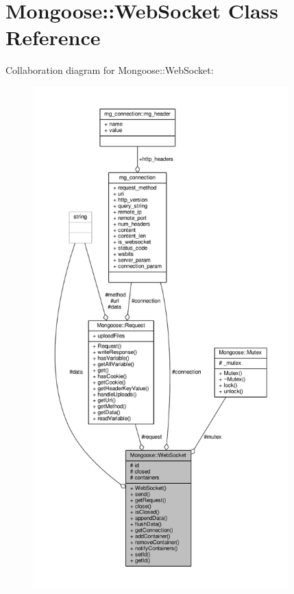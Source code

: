 \hypertarget{classMongoose_1_1WebSocket}{}\section{Mongoose\+:\+:Web\+Socket Class Reference}
\label{classMongoose_1_1WebSocket}


Collaboration diagram for Mongoose\+:\+:Web\+Socket\+:
\nopagebreak
\begin{figure}[H]
\begin{center}
\leavevmode
\includegraphics[height=550pt]{d0/d20/classMongoose_1_1WebSocket__coll__graph}
\end{center}
\end{figure}
